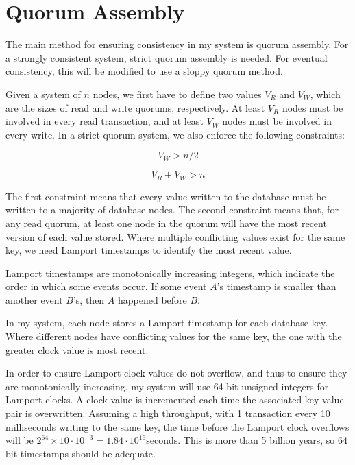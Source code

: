 \documentclass[12pt,a4paper,twoside,openright]{report}
\begin{document}



\section{Quorum Assembly}

The main method for ensuring consistency in my system is quorum assembly. For a strongly consistent system, strict quorum assembly is needed. For eventual consistency, this will be modified to use a sloppy quorum method.

Given a system of $n$ nodes, we first have to define two values $V_R$ and $V_W$, which are the sizes of read and write quorums, respectively. At least $V_R$ nodes must be involved in every read transaction, and at least $V_W$ nodes must be involved in every write. In a strict quorum system, we also enforce the following constraints:

$$V_W > n / 2$$

$$V_R + V_W > n$$

The first constraint means that every value written to the database must be written to a majority of database nodes. The second constraint means that, for any read quorum, at least one node in the quorum will have the most recent version of each value stored. Where multiple conflicting values exist for the same key, we need Lamport timestamps to identify the most recent value.

Lamport timestamps are monotonically increasing integers, which indicate the order in which some events occur. If some event $A$'s timestamp is smaller than another event $B$'s, then $A$ happened before $B$.

In my system, each node stores a Lamport timestamp for each database key. Where different nodes have conflicting values for the same key, the one with the greater clock value is most recent.

In order to ensure Lamport clock values do not overflow, and thus to ensure they are monotonically increasing, my system will use 64 bit unsigned integers for Lamport clocks. A clock value is incremented each time the associated key-value pair is overwritten. Assuming a high throughput, with 1 transaction every 10 milliseconds writing to the same key, the time before the Lamport clock overflows will be $2^{64} \times 10 \cdot 10^{-3} = 1.84 \cdot 10^{16} \text{seconds}$. This is more than 5 billion years, so 64 bit timestamps should be adequate.
\end{document}
